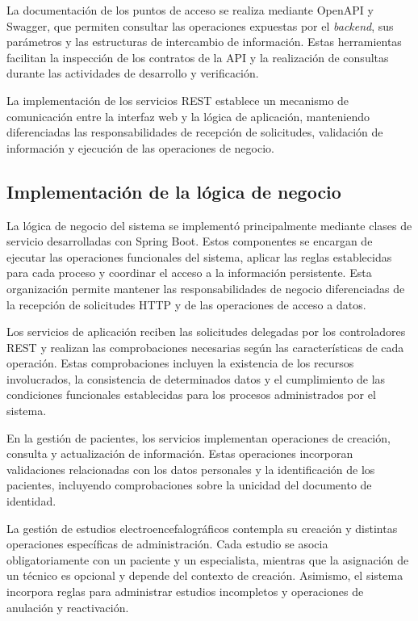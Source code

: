 La documentación de los puntos de acceso
se realiza mediante OpenAPI y Swagger,
que permiten consultar las operaciones
expuestas por el \textit{backend}, sus parámetros
y las estructuras de intercambio de
información. Estas herramientas facilitan
la inspección de los contratos de la API
y la realización de consultas durante
las actividades de desarrollo y verificación.

La implementación de los servicios REST
establece un mecanismo de comunicación
entre la interfaz web y la lógica de
aplicación, manteniendo diferenciadas
las responsabilidades de recepción de
solicitudes, validación de información
y ejecución de las operaciones de negocio.


\subsection{Implementación de la lógica de negocio}

La lógica de negocio del sistema se implementó
principalmente mediante clases de servicio
desarrolladas con Spring Boot. Estos componentes
se encargan de ejecutar las operaciones
funcionales del sistema, aplicar las reglas
establecidas para cada proceso y coordinar
el acceso a la información persistente.
Esta organización permite mantener las
responsabilidades de negocio diferenciadas
de la recepción de solicitudes HTTP y de
las operaciones de acceso a datos.

Los servicios de aplicación reciben las
solicitudes delegadas por los controladores
REST y realizan las comprobaciones necesarias
según las características de cada operación.
Estas comprobaciones incluyen la existencia
de los recursos involucrados, la consistencia
de determinados datos y el cumplimiento
de las condiciones funcionales establecidas
para los procesos administrados por el sistema.

En la gestión de pacientes, los servicios
implementan operaciones de creación, consulta
y actualización de información. Estas
operaciones incorporan validaciones relacionadas
con los datos personales y la identificación
de los pacientes, incluyendo comprobaciones
sobre la unicidad del documento de identidad.

La gestión de estudios electroencefalográficos
contempla su creación y distintas operaciones
específicas de administración. Cada estudio
se asocia obligatoriamente con un paciente
y un especialista, mientras que la asignación
de un técnico es opcional y depende del
contexto de creación. Asimismo, el sistema
incorpora reglas para administrar estudios
incompletos y operaciones de anulación
y reactivación.

